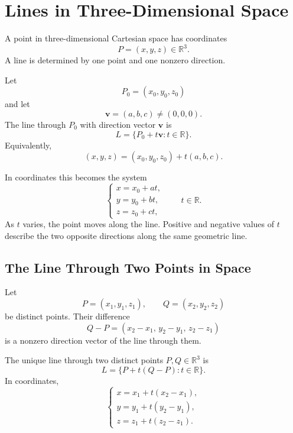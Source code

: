 \section{Lines in Three-Dimensional Space}

A point in three-dimensional Cartesian space has coordinates
\[
P=(x,y,z)\in\mathbb{R}^3.
\]
A line is determined by one point and one nonzero direction.

\begin{definitionbox}
Let
\[
P_0=(x_0,y_0,z_0)
\]
and let
\[
\mathbf{v}=(a,b,c)\neq(0,0,0).
\]
The line through $P_0$ with direction vector $\mathbf{v}$ is
\[
L=\{P_0+t\mathbf{v}:t\in\mathbb{R}\}.
\]
Equivalently,
\[
(x,y,z)=(x_0,y_0,z_0)+t(a,b,c).
\]
\end{definitionbox}

In coordinates this becomes the system
\[
\begin{cases}
x=x_0+at,\\
y=y_0+bt,\\
z=z_0+ct,
\end{cases}
\qquad t\in\mathbb{R}.
\]
As $t$ varies, the point moves along the line. Positive and negative values of
$t$ describe the two opposite directions along the same geometric line.

\begin{center}
\end{center}

\subsection{The Line Through Two Points in Space}

Let
\[
P=(x_1,y_1,z_1),
\qquad
Q=(x_2,y_2,z_2)
\]
be distinct points. Their difference
\[
Q-P=(x_2-x_1,\,y_2-y_1,\,z_2-z_1)
\]
is a nonzero direction vector of the line through them.

\begin{theorembox}
The unique line through two distinct points $P,Q\in\mathbb{R}^3$ is
\[
L=\{P+t(Q-P):t\in\mathbb{R}\}.
\]
In coordinates,
\[
\begin{cases}
x=x_1+t(x_2-x_1),\\
y=y_1+t(y_2-y_1),\\
z=z_1+t(z_2-z_1).
\end{cases}
\]
\end{theorembox}

